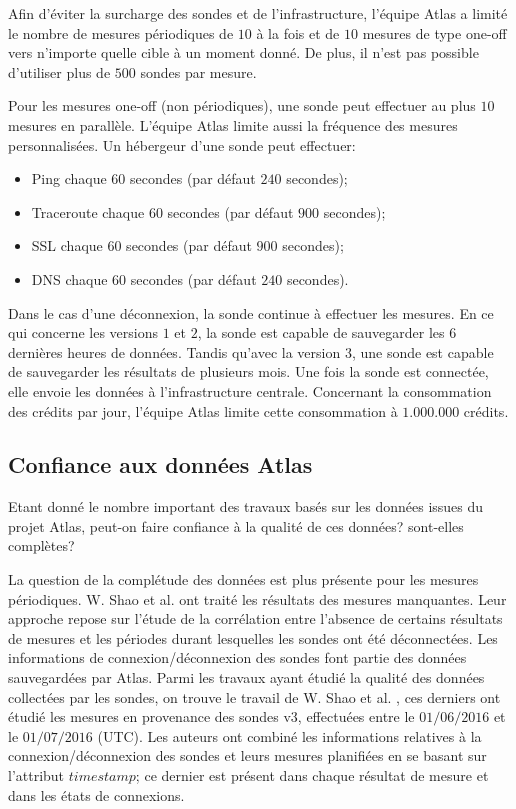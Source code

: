 Afin d'éviter la surcharge  des sondes et de l'infrastructure, l'équipe Atlas a limité le nombre de mesures périodiques de $10$ à la fois et de $10$ mesures de type one-off vers n'importe quelle cible à un moment donné. De plus, il n'est pas possible d'utiliser  plus de $500$ sondes par mesure.

Pour les mesures one-off (non périodiques), une sonde peut effectuer au plus $10$ mesures en parallèle. L'équipe Atlas limite aussi la fréquence des mesures personnalisées. Un hébergeur d'une sonde peut effectuer:

\begin{itemize}
	\item Ping chaque $60$ secondes (par défaut  $240$ secondes);
	\item Traceroute chaque $60$ secondes (par défaut  $900$ secondes);
	\item SSL chaque $60$ secondes (par défaut  $900$ secondes);
	\item DNS chaque $60$ secondes (par défaut $240$ secondes).
\end{itemize}

Dans le cas d'une déconnexion, la sonde continue à effectuer les mesures. En ce qui concerne les versions $1$ et $2$, la sonde est capable de sauvegarder les  $6$ dernières heures de données. Tandis qu'avec  la  version $3$, une sonde est capable de sauvegarder les résultats de plusieurs mois. Une fois la sonde est connectée, elle envoie les  données à l'infrastructure centrale.
Concernant la consommation des crédits par jour, l'équipe Atlas limite cette consommation à  $1.000.000$ crédits.


\subsection{Confiance aux données Atlas}

Etant donné le nombre important des travaux basés sur les données issues du projet Atlas, peut-on faire confiance à la qualité de ces données?  sont-elles complètes?

La question de la complétude des données est plus présente pour les mesures périodiques. W. Shao et al.  \cite{DBLP:journals/corr/ShaoRDV17} ont traité les résultats des mesures manquantes.  Leur approche  repose sur l'étude de la corrélation entre  l'absence de certains résultats de mesures et les périodes durant lesquelles les sondes  ont été déconnectées. 
Les informations de connexion/déconnexion des sondes font partie des données sauvegardées par  Atlas. Parmi les travaux ayant étudié la qualité des données collectées par les sondes, on trouve le travail de W. Shao et al.  \cite{DBLP:journals/corr/ShaoRDV17},  ces derniers  ont étudié les mesures en provenance des  sondes v$3$, effectuées entre le $01/06/2016$ et  le $01/07/2016$ (UTC). Les auteurs ont combiné les informations relatives à la connexion/déconnexion des sondes et leurs mesures planifiées en se basant sur l'attribut $timestamp$; ce dernier est présent dans chaque résultat de mesure et dans les états de connexions.


